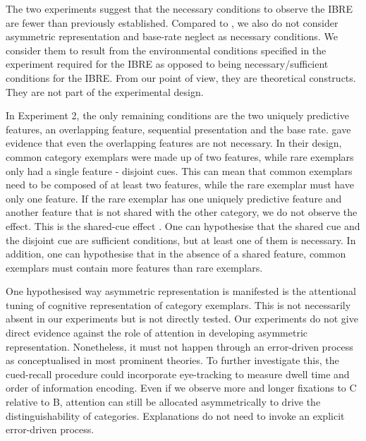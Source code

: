 \documentclass[10pt,letterpaper]{article}
\begin{document}
The two experiments suggest that the necessary conditions to observe the IBRE are fewer than previously established.
Compared to , we also do not consider asymmetric representation and base-rate neglect as necessary conditions.
We consider them to result from the environmental conditions specified in the experiment required for the IBRE as opposed to being necessary/sufficient conditions for the IBRE.
From our point of view, they are theoretical constructs.
They are not part of the experimental design.

In Experiment 2, the only remaining conditions are the two uniquely predictive features, an overlapping feature, sequential presentation and the base rate.
\cite{johansen2007paradoxical} gave evidence that even the overlapping features are not necessary.
In their design, common category exemplars were made up of two features, while rare exemplars only had a single feature - disjoint cues.
This can mean that common exemplars need to be composed of at least two features, while the rare exemplar must have only one feature.
If the rare exemplar has one uniquely predictive feature and another feature that is not shared with the other category, we do not observe the effect.
This is the shared-cue effect \cite{kruschke2001inverse, wills2014attention}.
One can hypothesise that the shared cue and the disjoint cue are sufficient conditions, but at least one of them is necessary.
In addition, one can hypothesise that in the absence of a shared feature, common exemplars must contain more features than rare exemplars.

One hypothesised way asymmetric representation is manifested is the attentional tuning of cognitive representation of category exemplars.
This is not necessarily absent in our experiments but is not directly tested.
Our experiments do not give direct evidence against the role of attention in developing asymmetric representation.
Nonetheless, it must not happen through an error-driven process as conceptualised in most prominent theories.
To further investigate this, the cued-recall procedure could incorporate eye-tracking to measure dwell time and order of information encoding.
Even if we observe more and longer fixations to C relative to B, attention can still be allocated asymmetrically to drive the distinguishability of categories.
Explanations do not need to invoke an explicit error-driven process.
\end{document}
